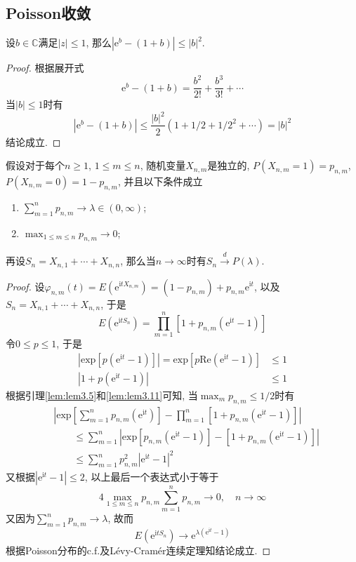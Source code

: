 \documentclass[cn, 12pt, math=mtpro2, bibstyle=apa, blue, twocol]{elegantbook}
\begin{document}
\subsection{Poisson收敛}
\begin{lemma}\label{lem:lem3.11}
设$b\in\mathbb{C}$满足$|z|\leq 1$, 那么$|\text{e}^b-(1+b)|\leq |b|^2$.
\end{lemma}
\begin{proof}
  根据展开式
  $$\text{e}^b-(1+b)=\frac{b^2}{2!}+\frac{b^3}{3!}+\cdots$$
  当$|b|\leq1$时有
  $$|\text{e}^b-(1+b)|\leq \frac{|b|^2}{2}(1+1/2+1/2^2+\cdots)=|b|^2$$
  结论成立.
\end{proof}

\begin{theorem}
假设对于每个$n\ge1$, $1\leq m\leq n$, 随机变量$X_{n,m}$是独立的, $P(X_{n,m}=1)=p_{n,m}$, $P(X_{n,m}=0)=1-p_{n,m}$, 并且以下条件成立
\begin{enumerate}[label=(\arabic*)]
  \item $\sum_{m=1}^{n}p_{n,m}\to\lambda\in(0,\infty)$;
  \item $\max_{1\leq m\leq n}p_{n,m}\to 0$;
\end{enumerate}
再设$S_n=X_{n,1}+\cdots+X_{n,n}$, 那么当$n\to\infty$时有$S_n\xrightarrow{d} P(\lambda)$.
\end{theorem}
\begin{proof}
  设$\varphi_{n,m}(t)=E(\text{e}^{\text{i}tX_{n,m}})=(1-p_{n,m})+p_{n,m}\text{e}^{\text{i}t}$, 以及$S_n=X_{n,1}+\cdots+X_{n,n}$, 于是
  $$E(\text{e}^{\text{i}tS_n})=\prod_{m=1}^{n}[1+p_{n,m}(\text{e}^{\text{i}t}-1)]$$
  令$0\leq p\leq 1$, 于是
  \begin{align*}
  |\text{exp}[p(\text{e}^{\text{i}t}-1)]|=\text{exp}[p\text{Re}(\text{e}^{\text{i}t}-1)]&\leq 1 \\
  |1+p(\text{e}^{\text{i}t}-1)|&\leq 1
  \end{align*}
  根据引理\ref{lem:lem3.5}和\ref{lem:lem3.11}可知, 当$\max_mp_{n,m}\leq1/2$时有
  \begin{align*}
  &\left|\text{exp}\left[\sum_{m=1}^{n}p_{n,m}(\text{e}^{\text{i}t})\right]-\prod_{m=1}^{n}[1+p_{n,m}(\text{e}^{\text{i}t}-1)]\right| \\
  &\quad\quad \leq \sum_{m=1}^{n}|\text{exp}[p_{n,m}(\text{e}^{\text{i}t}-1)]-[1+p_{n,m}(\text{e}^{\text{i}t}-1)]| \\
  &\quad\quad \leq \sum_{m=1}^{n}p_{n,m}^2|\text{e}^{\text{i}t}-1|^2
  \end{align*}
  又根据$|\text{e}^{\text{i}t}-1|\leq2$, 以上最后一个表达式小于等于
  $$4\max_{1\leq m\leq n}p_{n,m}\sum_{m=1}^{n}p_{n,m}\to0,\quad n\to\infty$$
  又因为$\sum_{m=1}^{n}p_{n,m}\to\lambda$, 故而
  $$E(\text{e}^{\text{i}tS_n})\to \text{e}^{\lambda(\text{e}^{\text{i}t}-1)}$$
  根据Poisson分布的c.f.及Lévy-Cramér连续定理知结论成立.
\end{proof}
\end{document}
